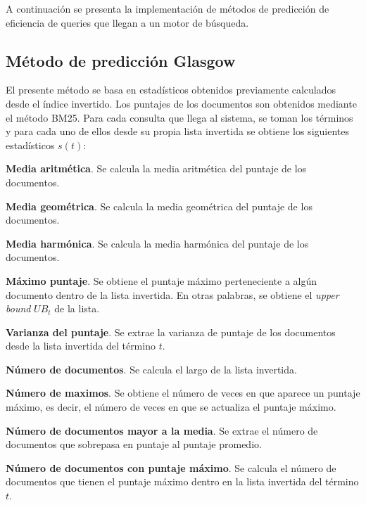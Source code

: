 A continuación se presenta la implementación de métodos de predicción de eficiencia de queries que llegan a un motor de búsqueda. 

\subsection{Método de predicción Glasgow}
\label{scheduling:glasgow}
El presente método \citep{Macdonald:2012} se basa en estadísticos obtenidos previamente calculados desde el índice invertido. Los puntajes de los documentos son obtenidos mediante el método BM25. Para cada consulta que llega al sistema, se toman los términos y para cada uno de ellos desde su propia lista invertida se obtiene los siguientes estadísticos $s(t)$:

\begin{list}{}{}
	\item \textbf{Media aritmética}. Se calcula la media aritmética del puntaje de los documentos.

	\item \textbf{Media geométrica}. Se calcula la media geométrica del puntaje de los documentos.

	\item \textbf{Media harmónica}.  Se calcula la media harmónica del puntaje de los documentos. 

	\item \textbf{Máximo puntaje}. Se obtiene el puntaje máximo perteneciente a algún documento dentro de la lista invertida. En otras palabras, se obtiene el \textit{upper bound} $UB_t$ de la lista. 

	\item \textbf{Varianza del puntaje}. Se extrae la varianza de puntaje de los documentos desde la lista invertida del término $t$. 
	
	\item \textbf{Número de documentos}. Se calcula el largo de la lista invertida. 

	\item \textbf{Número de maximos}. Se obtiene el número de veces en que aparece un puntaje máximo, es decir, el número de veces en que se actualiza el puntaje máximo. 

	\item \textbf{Número de documentos mayor a la media}. Se extrae el número de documentos que sobrepasa en puntaje al puntaje promedio. 
	
	\item \textbf{Número de documentos con puntaje máximo}. Se calcula el número de documentos que tienen el puntaje máximo dentro en la lista invertida del término $t$. 
	

\end{list}
